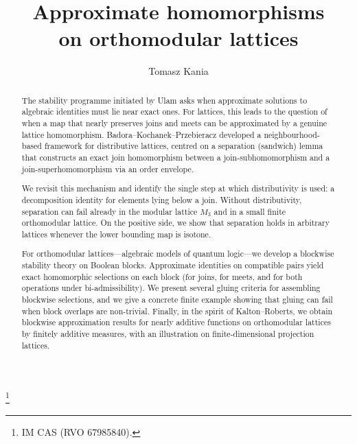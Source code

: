 \documentclass[11pt]{amsart}
\theoremstyle{definition}
\begin{document}
\title{Approximate homomorphisms\\ on orthomodular lattices}

\author[T.~Kania]{Tomasz Kania}
\address[T.~Kania]{Mathematical Institute\\Czech Academy of Sciences\\\v{Z}itn\'{a} 25\\115 67 Praha 1\\Czech Republic and Institute of Mathematics and Computer Science\\ Jagiellonian University\\ {\L}ojasiewicza 6, 30-348 Krak\'{o}w, Poland}

\thanks{IM CAS (RVO 67985840).}


\begin{abstract}
The stability programme initiated by Ulam asks when approximate solutions to algebraic
identities must lie near exact ones.
For lattices, this leads to the question of when a map that nearly preserves joins and meets
can be approximated by a genuine lattice homomorphism.
Badora--Kochanek--Przebieracz developed a neighbourhood-based framework for distributive
lattices, centred on a separation (sandwich) lemma that constructs an exact join homomorphism
between a join-subhomomorphism and a join-superhomomorphism via an order envelope.

We revisit this mechanism and identify the single step at which distributivity is used: a
decomposition identity for elements lying below a join.
Without distributivity, separation can fail already in the modular lattice $M_3$ and in a small
finite orthomodular lattice.
On the positive side, we show that separation holds in arbitrary lattices whenever the lower
bounding map is isotone.

For orthomodular lattices---algebraic models of quantum logic---we develop a blockwise stability
theory on Boolean blocks.
Approximate identities on compatible pairs yield exact homomorphic selections on each block
(for joins, for meets, and for both operations under bi-admissibility).
We present several gluing criteria for assembling blockwise selections, and we give a concrete
finite example showing that gluing can fail when block overlaps are non-trivial.
Finally, in the spirit of Kalton--Roberts, we obtain blockwise approximation results for nearly
additive functions on orthomodular lattices by finitely additive measures, with an illustration
on finite-dimensional projection lattices.
\end{abstract}
\end{document}
